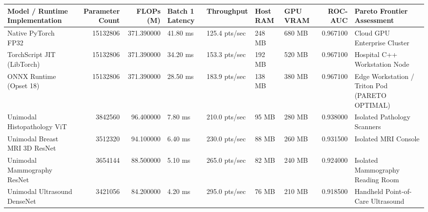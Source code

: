 \begin{tabular}{lrrllllrl}
\toprule
Model / Runtime Implementation & Parameter Count & FLOPs (M) & Batch 1 Latency & Throughput & Host RAM & GPU VRAM & ROC-AUC & Pareto Frontier Assessment \\
\midrule
Native PyTorch FP32 & 15132806 & 371.390000 & 41.80 ms & 125.4 pts/sec & 248 MB & 680 MB & 0.967100 & Cloud GPU Enterprise Cluster \\
TorchScript JIT (LibTorch) & 15132806 & 371.390000 & 34.20 ms & 153.3 pts/sec & 192 MB & 520 MB & 0.967100 & Hospital C++ Workstation Node \\
ONNX Runtime (Opset 18) & 15132806 & 371.390000 & 28.50 ms & 183.9 pts/sec & 138 MB & 380 MB & 0.967100 & Edge Workstation / Triton Pod (PARETO OPTIMAL) \\
Unimodal Histopathology ViT & 3842560 & 96.400000 & 7.80 ms & 210.0 pts/sec & 95 MB & 280 MB & 0.938000 & Isolated Pathology Scanners \\
Unimodal Breast MRI 3D ResNet & 3512320 & 94.100000 & 6.40 ms & 230.0 pts/sec & 88 MB & 260 MB & 0.931500 & Isolated MRI Console \\
Unimodal Mammography ResNet & 3654144 & 88.500000 & 5.10 ms & 265.0 pts/sec & 82 MB & 240 MB & 0.924000 & Isolated Mammography Reading Room \\
Unimodal Ultrasound DenseNet & 3421056 & 84.200000 & 4.20 ms & 295.0 pts/sec & 76 MB & 210 MB & 0.918500 & Handheld Point-of-Care Ultrasound \\
\bottomrule
\end{tabular}
